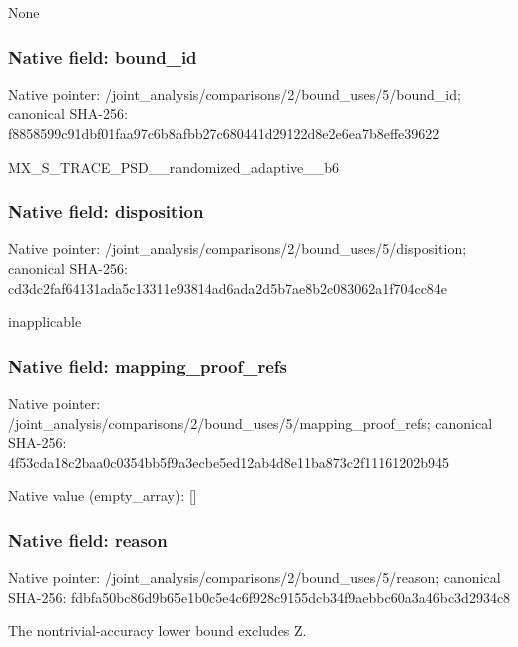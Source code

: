 \documentclass[10pt,a4paper]{article}
\begin{document}
\begingroup\raggedright\sloppy None\par\endgroup

\subsubsection{Native field: bound\_\allowbreak{}id}
Native pointer: /joint\_\allowbreak{}analysis/comparisons/2/bound\_\allowbreak{}uses/5/bound\_\allowbreak{}id; canonical SHA-256: f8858599c91dbf01faa97c6b8afbb27c680441d29122d8e2e6ea7b8effe39622

\begingroup\raggedright\sloppy MX\_\allowbreak{}S\_\allowbreak{}TRACE\_\allowbreak{}PSD\_\allowbreak{}\_\allowbreak{}randomized\_\allowbreak{}adaptive\_\allowbreak{}\_\allowbreak{}b6\par\endgroup

\subsubsection{Native field: disposition}
Native pointer: /joint\_\allowbreak{}analysis/comparisons/2/bound\_\allowbreak{}uses/5/disposition; canonical SHA-256: cd3dc2faf64131ada5c13311e93814ad6ada2d5b7ae8b2c083062a1f704cc84e

\begingroup\raggedright\sloppy inapplicable\par\endgroup

\subsubsection{Native field: mapping\_\allowbreak{}proof\_\allowbreak{}refs}
Native pointer: /joint\_\allowbreak{}analysis/comparisons/2/bound\_\allowbreak{}uses/5/mapping\_\allowbreak{}proof\_\allowbreak{}refs; canonical SHA-256: 4f53cda18c2baa0c0354bb5f9a3ecbe5ed12ab4d8e11ba873c2f11161202b945

Native value (empty\_\allowbreak{}array): []

\subsubsection{Native field: reason}
Native pointer: /joint\_\allowbreak{}analysis/comparisons/2/bound\_\allowbreak{}uses/5/reason; canonical SHA-256: fdbfa50bc86d9b65e1b0c5e4c6f928c9155dcb34f9aebbc60a3a46bc3d2934c8

\begingroup\raggedright\sloppy The nontrivial-accuracy lower bound excludes Z.\par\endgroup
\end{document}
